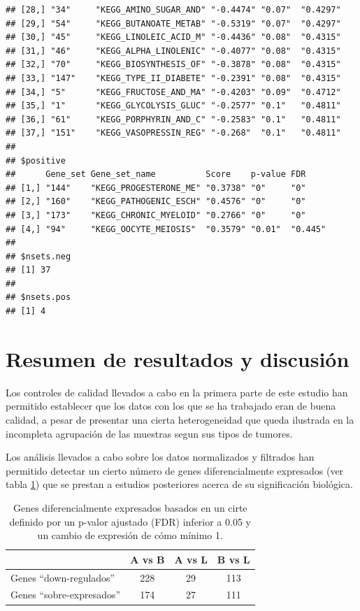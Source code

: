 \documentclass[a4paper]{article}\usepackage[]{graphicx}\usepackage[]{color}
\makeatletter
\newenvironment{kframe}{%
 \def\at@end@of@kframe{}%
 \ifinner\ifhmode%
  \def\at@end@of@kframe{\end{minipage}}%
  \begin{minipage}{\columnwidth}%
 \fi\fi%
 \def\FrameCommand##1{\hskip\@totalleftmargin \hskip-\fboxsep
 \colorbox{shadecolor}{##1}\hskip-\fboxsep
     \hskip-\linewidth \hskip-\@totalleftmargin \hskip\columnwidth}%
 \MakeFramed {\advance\hsize-\width
   \@totalleftmargin\z@ \linewidth\hsize
   \@setminipage}}%
 {\par\unskip\endMakeFramed%
 \at@end@of@kframe}
\newenvironment{knitrout}{}{} %
\makeatother
\begin{document}
\begin{knitrout}
\begin{kframe}
\begin{verbatim}
## [28,] "34"     "KEGG_AMINO_SUGAR_AND" "-0.4474" "0.07"  "0.4297"
## [29,] "54"     "KEGG_BUTANOATE_METAB" "-0.5319" "0.07"  "0.4297"
## [30,] "45"     "KEGG_LINOLEIC_ACID_M" "-0.4436" "0.08"  "0.4315"
## [31,] "46"     "KEGG_ALPHA_LINOLENIC" "-0.4077" "0.08"  "0.4315"
## [32,] "70"     "KEGG_BIOSYNTHESIS_OF" "-0.3878" "0.08"  "0.4315"
## [33,] "147"    "KEGG_TYPE_II_DIABETE" "-0.2391" "0.08"  "0.4315"
## [34,] "5"      "KEGG_FRUCTOSE_AND_MA" "-0.4203" "0.09"  "0.4712"
## [35,] "1"      "KEGG_GLYCOLYSIS_GLUC" "-0.2577" "0.1"   "0.4811"
## [36,] "61"     "KEGG_PORPHYRIN_AND_C" "-0.2583" "0.1"   "0.4811"
## [37,] "151"    "KEGG_VASOPRESSIN_REG" "-0.268"  "0.1"   "0.4811"
## 
## $positive
##      Gene_set Gene_set_name          Score    p-value FDR    
## [1,] "144"    "KEGG_PROGESTERONE_ME" "0.3738" "0"     "0"    
## [2,] "160"    "KEGG_PATHOGENIC_ESCH" "0.4576" "0"     "0"    
## [3,] "173"    "KEGG_CHRONIC_MYELOID" "0.2766" "0"     "0"    
## [4,] "94"     "KEGG_OOCYTE_MEIOSIS"  "0.3579" "0.01"  "0.445"
## 
## $nsets.neg
## [1] 37
## 
## $nsets.pos
## [1] 4
\end{verbatim}
\end{kframe}
\end{knitrout}

\section{Resumen de resultados y discusión}

Los controles de calidad llevados a cabo en la primera parte de  este estudio han permitido establecer que los datos con los que se ha trabajado eran de buena calidad, a pesar de presentar una cierta heterogeneidad que queda ilustrada en la incompleta agrupación de las muestras segun sus tipos de tumores.

Los análisis llevados a cabo sobre los datos normalizados y filtrados han permitido detectar un cierto número de genes diferencialmente expresados (ver tabla \ref{resum1}) que se prestan a estudios posteriores acerca de su significación biológica.

\begin{table}[htbp]
\caption{Genes diferencialmente expresados basados en un cirte definido por un p-valor ajustado (FDR) inferior a 0.05 y un cambio de expresión de cómo mínimo 1.}
\begin{tabular}{|l|c|c|c|}
\hline
 & A vs B & A vs L & B vs L \\ \hline
Genes “down-regulados” & 228 & 29 & 113 \\ \hline
Genes “sobre-expresados” & 174 & 27 & 111 \\ \hline
\end{tabular}
\label{resum1}
\end{table}
\end{document}
